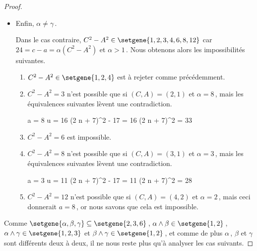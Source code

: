 \begin{proof}
\begin{itemize}
		\item Enfin, $\alpha \neq \gamma$\,. 
		
		\noindent
		Dans le cas contraire,
		$C^2 - A^2 \in \setgene{1, 2, 3, 4, 6, 8, 12}$
		car 
		$24 = c - a = \alpha(C^2 - A^2)$ et $\alpha > 1$\,.
		Nous obtenons alors les impossibilités suivantes.
		\begin{enumerate}
			\item $C^2 - A^2 \in \setgene{1, 2, 4}$ est à rejeter comme précédemment.
			
			\item $C^2 - A^2 = 3$ n'est possible que si $(C, A) = (2, 1)$ et $\alpha = 8$\,, mais les équivalences suivantes lèvent une contradiction.

    		\smallskip
    		\noindent\!\!%
       		\begin{stepcalc}[style = sar, ope = \iff]
    			a = 8
    		\explnext{}
    			u = 16
    		\explnext{}
    			(2 n + 7)^2 - 17 = 16
    		\explnext*{$33 \notin \NNsquare$}{}
    			(2 n + 7)^2 = 33
    		\end{stepcalc}	
			\smallskip
	
			\item $C^2 - A^2 = 6$ est impossible.
			
			\item $C^2 - A^2 = 8$ n'est possible que si $(C, A) = (3, 1)$ et $\alpha = 3$\,, mais les équivalences suivantes lèvent une contradiction.

    		\smallskip
    		\noindent\!\!%
       		\begin{stepcalc}[style = sar, ope = \iff]
    			a = 3
    		\explnext{}
    			u = 11
    		\explnext{}
    			(2 n + 7)^2 - 17 = 11
    		\explnext*{$28 \notin \NNsquare$}{}
    			(2 n + 7)^2 = 28
    		\end{stepcalc}	
			\smallskip
			
			
			\item $C^2 - A^2 = 12$ n'est possible que si $(C, A) = (4, 2)$ et $\alpha = 2$\,, mais ceci donnerait $a = 8$\,, or nous savons que cela est impossible.
		\end{enumerate}
	\end{itemize}


	Comme
	$\setgene{\alpha, \beta, \gamma} \subseteq \setgene{2, 3, 6}$\,,
	$\alpha \wedge \beta \in \setgene{1, 2}$\,,
	$\alpha \wedge \gamma \in \setgene{1, 2, 3}$ et
	$\beta \wedge \gamma \in \setgene{1, 2}$\,,
	et comme de plus $\alpha$\,, $\beta$ et $\gamma$ sont différents deux à deux, il ne nous reste plus qu'à analyser les cas suivants.


\end{proof}
